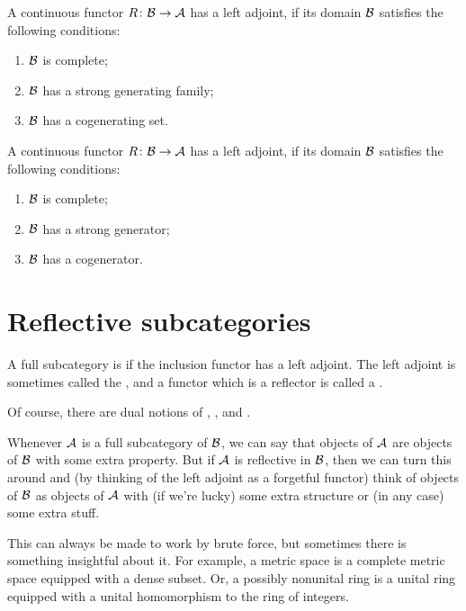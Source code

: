   \begin{cor}
    A continuous functor $R\colon{\cal B}\to{\cal A}$ has a left adjoint, if its domain ${\cal B}$ satisfies the following conditions:
    \begin{enumerate}
      \item ${\cal B}$ is complete;
      \item ${\cal B}$ has a strong generating family;
      \item ${\cal B}$ has a cogenerating set.
    \end{enumerate}
  \end{cor}
  \begin{cor}
    A continuous functor $R\colon{\cal B}\to{\cal A}$ has a left adjoint, if its domain ${\cal B}$ satisfies the following conditions:
    \begin{enumerate}
      \item ${\cal B}$ is complete;
      \item ${\cal B}$ has a strong generator;
      \item ${\cal B}$ has a cogenerator.
    \end{enumerate}
  \end{cor}



\newpage\section{Reflective subcategories}
  \begin{defn}
    A full subcategory is  if the inclusion functor has a left adjoint.
    The left adjoint is sometimes called the , and a functor which is a reflector is called a .
  \end{defn}
  \begin{rem}
    Of course, there are dual notions of , , and .
  \end{rem}
  \begin{rem}
    Whenever ${\cal A}$ is a full subcategory of ${\cal B}$, we can say that objects of ${\cal A}$ are objects of ${\cal B}$ with some extra property. But if ${\cal A}$ is reflective in ${\cal B}$, then we can turn this around and (by thinking of the left adjoint as a forgetful functor) think of objects of ${\cal B}$ as objects of ${\cal A}$ with (if we're lucky) some extra structure or (in any case) some extra stuff.

    This can always be made to work by brute force, but sometimes there is something insightful about it. For example, a metric space is a complete metric space equipped with a dense subset. Or, a possibly nonunital ring is a unital ring equipped with a unital homomorphism to the ring of integers.
  \end{rem}

